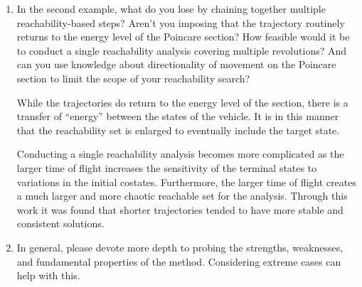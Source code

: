 \documentclass[11pt]{article}
\begin{document}
\begin{enumerate}
\item
    \begin{itshape}
In the second example, what do you lose by chaining together multiple reachability-based steps?  Aren't you imposing that the trajectory routinely returns to the energy level of the Poincare section? How feasible would it be to conduct a single reachability analysis covering multiple revolutions? And can you use knowledge about directionality of movement on the Poincare section to limit the scope of your reachability search?
\end{itshape}

While the trajectories do return to the energy level of the \Poincare section, there is a transfer of ``energy'' between the states of the vehicle.
It is in this manner that the reachability set is enlarged to eventually include the target state.

Conducting a single reachability analysis becomes more complicated as the larger time of flight increases the sensitivity of the terminal states to variations in the initial costates. 
Furthermore, the larger time of flight creates a much larger and more chaotic reachable set for the analysis.
Through this work it was found that shorter trajectories tended to have more stable and consistent solutions.

\item
    {\color{red}
    \begin{itshape}
In general, please devote more depth to probing the strengths, weaknesses, and fundamental properties of the method.  Considering extreme cases can help with this.
\end{itshape}
}
\end{enumerate}


\end{document}
